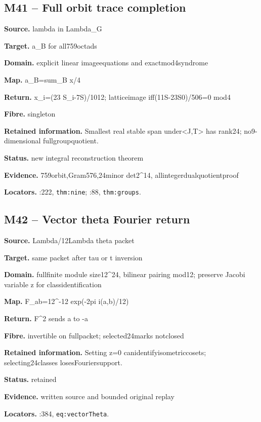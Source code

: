 \subsection*{M41 -- Full orbit trace completion}
\noindent\textbf{Source.} lambda in Lambda\_G\par
\noindent\textbf{Target.} a\_B for all759octads\par
\noindent\textbf{Domain.} explicit linear imageequations and exactmod4syndrome\par
\noindent\textbf{Map.} a\_B=sum\_B x/4\par
\noindent\textbf{Return.} x\_i=(23 S\_i-7S)/1012; latticeimage iff(11S-23S0)/506=0 mod4\par
\noindent\textbf{Fibre.} singleton\par
\noindent\textbf{Retained information.} Smallest real stable span under<J,T> has rank24; no9-dimensional fullgroupquotient.\par
\noindent\textbf{Status.} new integral reconstruction theorem\par
\noindent\textbf{Evidence.} 759orbit,Gram576,24minor det2\textasciicircum{}14, allintegerdualquotientproof\par
\noindent\textbf{Locators.} :222, \texttt{thm:nine}; :88, \texttt{thm:groups}.
\subsection*{M42 -- Vector theta Fourier return}
\noindent\textbf{Source.} Lambda/12Lambda theta packet\par
\noindent\textbf{Target.} same packet after tau or t inversion\par
\noindent\textbf{Domain.} fullfinite module size12\textasciicircum{}24, bilinear pairing mod12; preserve Jacobi variable z for classidentification\par
\noindent\textbf{Map.} F\_ab=12\textasciicircum{}-12 exp(-2pi i(a,b)/12)\par
\noindent\textbf{Return.} F\textasciicircum{}2 sends a to -a\par
\noindent\textbf{Fibre.} invertible on fullpacket; selected24marks notclosed\par
\noindent\textbf{Retained information.} Setting z=0 canidentifyisometriccosets; selecting24classes losesFouriersupport.\par
\noindent\textbf{Status.} retained\par
\noindent\textbf{Evidence.} written source and bounded original replay\par
\noindent\textbf{Locators.} :384, \texttt{eq:vectorTheta}.
